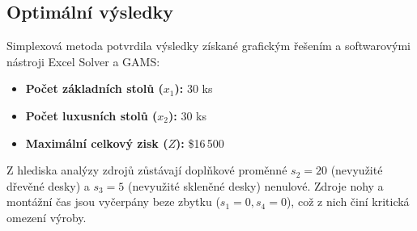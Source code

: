 \documentclass[../sablona-main.tex]{subfiles}
\begin{document}
\subsection{Optimální výsledky}
Simplexová metoda potvrdila výsledky získané grafickým řešením a softwarovými nástroji Excel Solver a GAMS:
\begin{itemize}
	\item \textbf{Počet základních stolů ($x_1$):} 30 ks 
	\item \textbf{Počet luxusních stolů ($x_2$):} 30 ks
	\item \textbf{Maximální celkový zisk ($Z$):} \$16\,500 
\end{itemize}

Z hlediska analýzy zdrojů zůstávají doplňkové proměnné $s_2 = 20$ (nevyužité dřevěné desky) a $s_3 = 5$ (nevyužité skleněné desky) nenulové. Zdroje nohy a montážní čas jsou vyčerpány beze zbytku ($s_1=0, s_4=0$), což z nich činí kritická omezení výroby.
\end{document}
